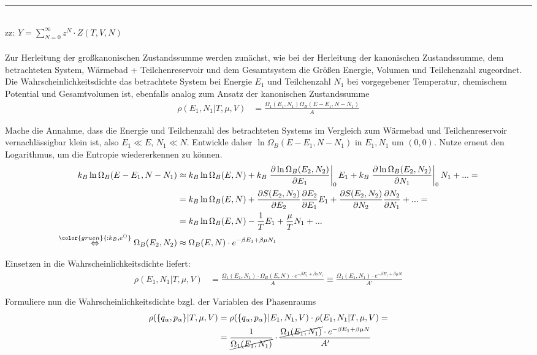 \documentclass{article}
\newcommand{\comment}[1]{{\color{gruen} {#1}}}
\begin{document}
{\color{violet}
\hrule
	\\
	zz: $Y = \sum_{N=0}^\infty z^N \cdot Z(T,V,N)$\\
	\\
	Zur Herleitung der großkanonischen Zustandssumme werden zunächst, wie bei der Herleitung der kanonischen Zustandssumme, dem betrachteten System, Wärmebad + Teilchenreservoir und dem Gesamtsystem die Größen Energie, Volumen und Teilchenzahl zugeordnet.\\
	Die Wahrscheinlichkeitsdichte das betrachtete System bei Energie $E_1$ und Teilchenzahl $N_1$ bei vorgegebener Temperatur, chemischem Potential und Gesamtvolumen ist, ebenfalls analog zum Ansatz der kanonischen Zustandssumme
		\begin{align*}
			\rho(E_1, N_1 | T, \mu, V) &= \frac{\Omega_1(E_1,N_1)\Omega_B(E-E_1,N-N_1)}{A}
		\end{align*}

	Mache die Annahme, dass die Energie und Teilchenzahl des betrachteten Systems im Vergleich zum Wärmebad und Teilchenreservoir vernachlässigbar klein ist, also $E_1\ll E$, $N_1\ll N$. Entwickle daher $\ln\Omega_B(E-E_1,N-N_1)$ in $E_1,N_1$ um $(0,0)$. Nutze erneut den Logarithmus, um die Entropie wiedererkennen zu können.
		\begin{align*}
			k_B\ln\Omega_B(E-E_1,N-N_1) &\approx k_B \ln\Omega_B(E,N) + k_B \left.\frac{\partial \ln\Omega_B(E_2,N_2)}{\partial E_1}\right|_{0} E_1 + k_B \left.\frac{\partial \ln\Omega_B(E_2,N_2)}{\partial N_1}\right|_{0} N_1 + ... = \\
			&= k_B \ln\Omega_B(E,N) + \frac{\partial S(E_2,N_2)}{\partial E_2}\frac{\partial E_2}{\partial E_1} E_1 + \frac{\partial S(E_2,N_2)}{\partial N_2}\frac{\partial N_2}{\partial N_1} + ... = \\
			&= k_B \ln\Omega_B(E,N) - \frac{1}{T}E_1 + \frac{\mu}{T} N_1 + ... \\
			\stackrel{\comment{:k_B, e^{()}}}{\Leftrightarrow} \Omega_B(E_2,N_2) &\approx \Omega_B(E,N) \cdot e^{-\beta E_1 + \beta\mu N_1}
		\end{align*}

	Einsetzen in die Wahrscheinlichkeitsdichte liefert:
		\begin{align*}
			\rho(E_1, N_1 | T, \mu, V) &= \frac{\Omega_1(E_1,N_1) \cdot \Omega_B(E,N) \cdot e^{-\beta E_1 + \beta\mu N_1}}{A} \equiv \frac{\Omega_1(E_1,N_1) \cdot e^{-\beta E_1 + \beta\mu N}}{A'}
		\end{align*}

	Formuliere nun die Wahrscheinlichkeitsdichte bzgl. der Variablen des Phasenraums
		\begin{align*}
			\rho(\{q_\alpha,p_\alpha\} | T,\mu,V) &= \rho(\{q_\alpha,p_\alpha\} | E_1, N_1, V ) \cdot \rho(E_1, N_1 | T, \mu, V) = \\
			&= \frac{1}{\cancel{\Omega_1(E_1,N_1)}} \cdot \frac{\cancel{\Omega_1(E_1,N_1)} \cdot e^{-\beta E_1 + \beta\mu N}}{A'}
		\end{align*}
	
}
\end{document}

